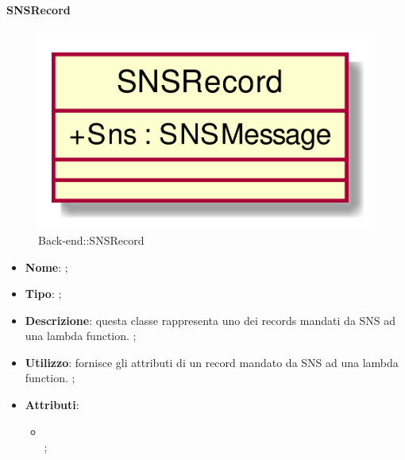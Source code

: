 \hypertarget{SNSRecord_label}{\paragraph{SNSRecord}}
\begin{figure}[h]
	\centering
	\includegraphics[width=\textwidth,height=\textheight,keepaspectratio]{images/ClassSNSRecord.png}
	\caption{Back-end::SNSRecord}
\end{figure}
\begin{itemize}
	\item \textbf{Nome}: ;
	\item \textbf{Tipo}: ;
	\item \textbf{Descrizione}: questa classe rappresenta uno dei records mandati da SNS ad una lambda function. ;
	\item \textbf{Utilizzo}: fornisce gli attributi di un record mandato da SNS ad una lambda function. ;
	\item \textbf{Attributi}:
	\begin{itemize}
		\item[]  \\
		;
	\end{itemize}
\end{itemize}

